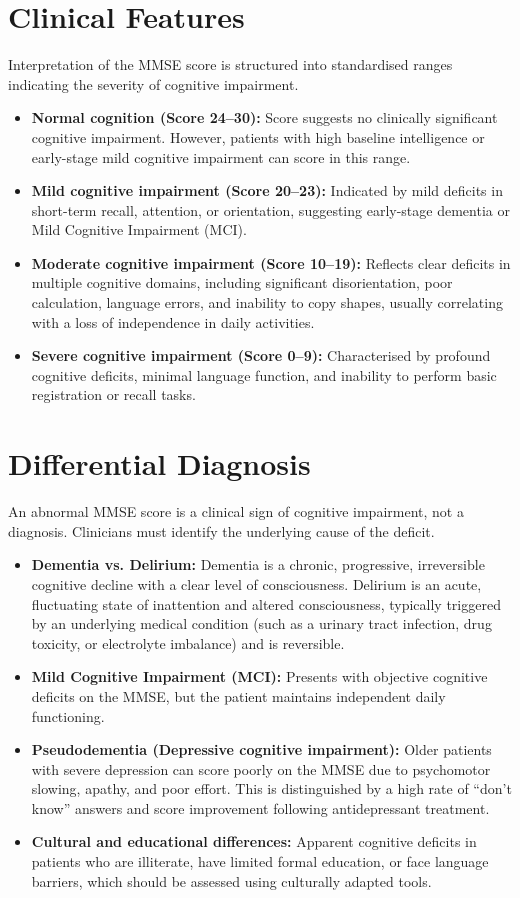 \section*{Clinical Features}
Interpretation of the MMSE score is structured into standardised ranges indicating the severity of cognitive impairment.
\begin{itemize}
    \item \textbf{Normal cognition (Score 24--30):} Score suggests no clinically significant cognitive impairment. However, patients with high baseline intelligence or early-stage mild cognitive impairment can score in this range.
    \item \textbf{Mild cognitive impairment (Score 20--23):} Indicated by mild deficits in short-term recall, attention, or orientation, suggesting early-stage dementia or Mild Cognitive Impairment (MCI).
    \item \textbf{Moderate cognitive impairment (Score 10--19):} Reflects clear deficits in multiple cognitive domains, including significant disorientation, poor calculation, language errors, and inability to copy shapes, usually correlating with a loss of independence in daily activities.
    \item \textbf{Severe cognitive impairment (Score 0--9):} Characterised by profound cognitive deficits, minimal language function, and inability to perform basic registration or recall tasks.
\end{itemize}

\section*{Differential Diagnosis}
An abnormal MMSE score is a clinical sign of cognitive impairment, not a diagnosis. Clinicians must identify the underlying cause of the deficit.
\begin{itemize}
    \item \textbf{Dementia vs. Delirium:} Dementia is a chronic, progressive, irreversible cognitive decline with a clear level of consciousness. Delirium is an acute, fluctuating state of inattention and altered consciousness, typically triggered by an underlying medical condition (such as a urinary tract infection, drug toxicity, or electrolyte imbalance) and is reversible.
    \item \textbf{Mild Cognitive Impairment (MCI):} Presents with objective cognitive deficits on the MMSE, but the patient maintains independent daily functioning.
    \item \textbf{Pseudodementia (Depressive cognitive impairment):} Older patients with severe depression can score poorly on the MMSE due to psychomotor slowing, apathy, and poor effort. This is distinguished by a high rate of ``don't know'' answers and score improvement following antidepressant treatment.
    \item \textbf{Cultural and educational differences:} Apparent cognitive deficits in patients who are illiterate, have limited formal education, or face language barriers, which should be assessed using culturally adapted tools.
\end{itemize}

